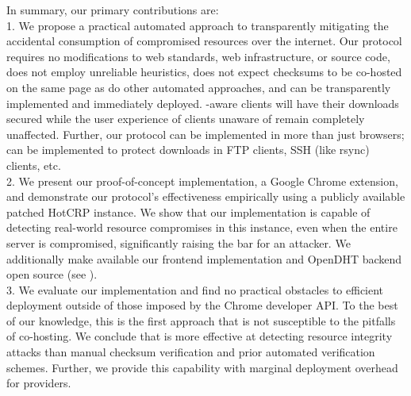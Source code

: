 In summary, our primary contributions are: \\

1. We propose a practical automated approach to transparently mitigating the
accidental consumption of compromised resources over the internet. Our protocol
requires no modifications to web standards, web infrastructure, or source code,
does not employ unreliable heuristics, does not expect checksums to be co-hosted
on the same page as do other automated approaches, and can be transparently
implemented and immediately deployed. \SYSTEM{}-aware clients will have their
downloads secured while the user experience of clients unaware of \SYSTEM{}
remain completely unaffected. Further, our protocol can be implemented in more
than just browsers; \SYSTEM{} can be implemented to protect downloads in FTP
clients, SSH (like rsync) clients, etc. \\

2. We present our proof-of-concept implementation, a Google Chrome extension,
and demonstrate our protocol's effectiveness empirically using a publicly
available patched HotCRP instance. We show that our implementation is capable of
detecting real-world resource compromises in this instance, even when the entire
server is compromised, significantly raising the bar for an attacker. We
additionally make available our frontend implementation and OpenDHT backend open
source (see ). \\

3. We evaluate our implementation and find no practical obstacles to efficient
deployment outside of those imposed by the Chrome developer API. To the best of
our knowledge, this is the first approach that is not susceptible to the
pitfalls of co-hosting. We conclude that \SYSTEM{} is more effective at
detecting resource integrity attacks than manual checksum verification and prior
automated verification schemes. Further, we provide this capability with
marginal deployment overhead for providers.
